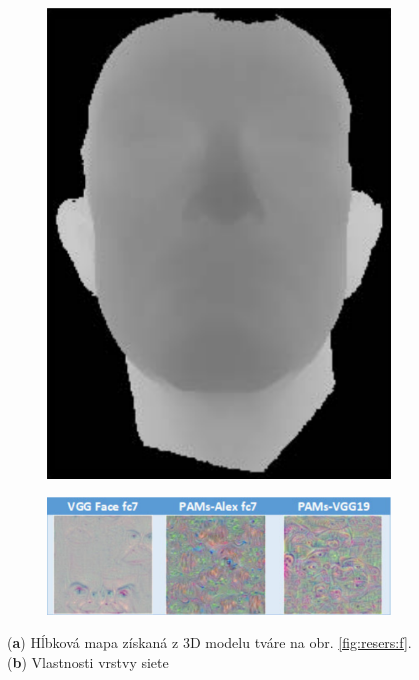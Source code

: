 \begin{figure}[h]
	\centering
	\begin{subfigure}[b]{0.195\textwidth}
		\centering
		\includegraphics[width=\textwidth]{figures/resers_h.png}
		\caption{}
		\label{fig:resers:h}
	\end{subfigure}
	\hfill
	\begin{subfigure}[b]{0.79\textwidth}
		\centering
		\includegraphics[width=\textwidth]{figures/resers_g.png}
		\caption{}
		\label{fig:resers:g}
	\end{subfigure}
	\caption{(\textbf{a}) Hĺbková mapa získaná z 3D modelu tváre na obr. \ref{fig:resers:f}.
	(\textbf{b}) Vlastnosti vrstvy siete \cite{Islam.}} 
	\label{fig:resers:3}
\end{figure}

